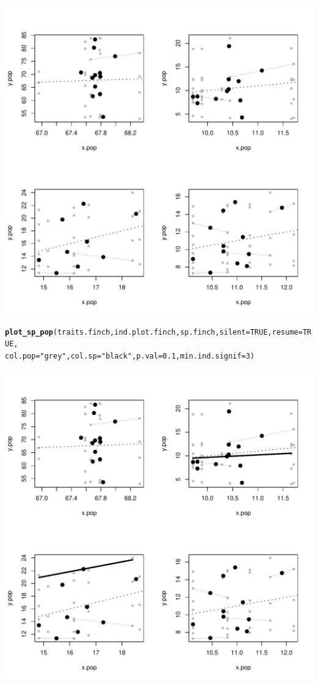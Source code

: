\documentclass[12pt]{article}\usepackage[]{graphicx}\usepackage[]{color}
\makeatletter
\def\maxwidth{ %
  \ifdim\Gin@nat@width>\linewidth
    \linewidth
  \else
    \Gin@nat@width
  \fi
}
\newcommand{\hlnum}[1]{\textcolor[rgb]{0.686,0.059,0.569}{#1}}%
\newcommand{\hlstr}[1]{\textcolor[rgb]{0.192,0.494,0.8}{#1}}%
\newcommand{\hlstd}[1]{\textcolor[rgb]{0.345,0.345,0.345}{#1}}%
\newcommand{\hlkwc}[1]{\textcolor[rgb]{0.333,0.667,0.333}{#1}}%
\newcommand{\hlkwd}[1]{\textcolor[rgb]{0.737,0.353,0.396}{\textbf{#1}}}%
\newenvironment{kframe}{%
 \def\at@end@of@kframe{}%
 \ifinner\ifhmode%
  \def\at@end@of@kframe{\end{minipage}}%
  \begin{minipage}{\columnwidth}%
 \fi\fi%
 \def\FrameCommand##1{\hskip\@totalleftmargin \hskip-\fboxsep
 \colorbox{shadecolor}{##1}\hskip-\fboxsep
     \hskip-\linewidth \hskip-\@totalleftmargin \hskip\columnwidth}%
 \MakeFramed {\advance\hsize-\width
   \@totalleftmargin\z@ \linewidth\hsize
   \@setminipage}}%
 {\par\unskip\endMakeFramed%
 \at@end@of@kframe}
\newenvironment{knitrout}{}{} %
\makeatother
\begin{document}
\begin{knitrout}
\includegraphics[width=\maxwidth]{figure/unnamed-chunk-192} 
\begin{kframe}\begin{alltt}
\hlkwd{plot_sp_pop}\hlstd{(traits.finch, ind.plot.finch, sp.finch,} \hlkwc{silent} \hlstd{=} \hlnum{TRUE}\hlstd{,} \hlkwc{resume} \hlstd{=} \hlnum{TRUE}\hlstd{,}
    \hlkwc{col.pop} \hlstd{=} \hlstr{"grey"}\hlstd{,} \hlkwc{col.sp} \hlstd{=} \hlstr{"black"}\hlstd{,} \hlkwc{p.val} \hlstd{=} \hlnum{0.1}\hlstd{,} \hlkwc{min.ind.signif} \hlstd{=} \hlnum{3}\hlstd{)}
\end{alltt}
\end{kframe}
\includegraphics[width=\maxwidth]{figure/unnamed-chunk-193} 

\end{knitrout}
\end{document}
